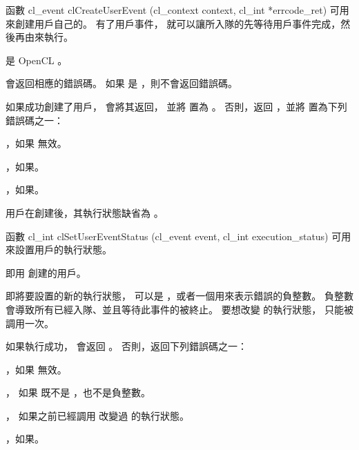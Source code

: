 函數
\startclc
cl_event clCreateUserEvent (cl_context context, cl_int *errcode_ret)
\stopclc
可用來創建用戶自己的。
有了用戶事件，
就可以讓所入隊的先等待用戶事件完成，然後再由來執行。

 是 OpenCL 。

 會返回相應的錯誤碼。
如果  是 ，則不會返回錯誤碼。

如果成功創建了用戶，  會將其返回，
並將  置為 。
否則，返回 ，並將  置為下列錯誤碼之一：
\startigBase
\item {}，如果  無效。

\item {}，如果\scdevfailres。

\item {}，如果\schostfailres。
\stopigBase

用戶在創建後，其執行狀態缺省為 。

函數
\startclc
cl_int clSetUserEventStatus (cl_event event, cl_int execution_status)
\stopclc
可用來設置用戶的執行狀態。

 即用  創建的用戶。

 即將要設置的新的執行狀態，
可以是 ，或者一個用來表示錯誤的負整數。
負整數會導致所有已經入隊、並且等待此事件的被終止。
要想改變  的執行狀態，  只能被調用一次。

如果執行成功，  會返回 。
否則，返回下列錯誤碼之一：
\startigBase
\item {}，如果  無效。

\item {}，
如果  既不是 ，也不是負整數。

\item {}，
如果之前已經調用  改變過  的執行狀態。

\item {}，如果\scdevfailres。

